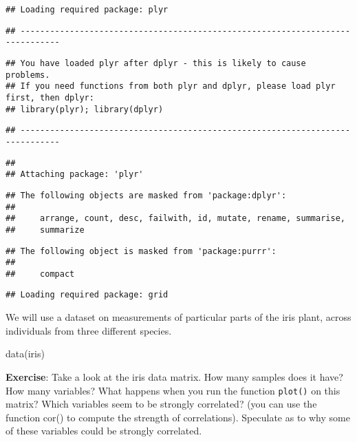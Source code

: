 \documentclass[
]{book}
\newenvironment{Shaded}{\begin{snugshade}}{\end{snugshade}}
\newcommand{\FunctionTok}[1]{\textcolor[rgb]{0.00,0.00,0.00}{#1}}
\newcommand{\NormalTok}[1]{#1}
\begin{document}
\begin{verbatim}
## Loading required package: plyr
\end{verbatim}

\begin{verbatim}
## ------------------------------------------------------------------------------
\end{verbatim}

\begin{verbatim}
## You have loaded plyr after dplyr - this is likely to cause problems.
## If you need functions from both plyr and dplyr, please load plyr first, then dplyr:
## library(plyr); library(dplyr)
\end{verbatim}

\begin{verbatim}
## ------------------------------------------------------------------------------
\end{verbatim}

\begin{verbatim}
## 
## Attaching package: 'plyr'
\end{verbatim}

\begin{verbatim}
## The following objects are masked from 'package:dplyr':
## 
##     arrange, count, desc, failwith, id, mutate, rename, summarise,
##     summarize
\end{verbatim}

\begin{verbatim}
## The following object is masked from 'package:purrr':
## 
##     compact
\end{verbatim}

\begin{verbatim}
## Loading required package: grid
\end{verbatim}

We will use a dataset on measurements of particular parts of the iris plant, across individuals from three different species.

\begin{Shaded}
\begin{Highlighting}[]
\FunctionTok{data}\NormalTok{(iris)}
\end{Highlighting}
\end{Shaded}

\textbf{Exercise}: Take a look at the iris data matrix. How many samples does it have? How many variables? What happens when you run the function \texttt{plot()} on this matrix? Which variables seem to be strongly correlated? (you can use the function cor() to compute the strength of correlations). Speculate as to why some of these variables could be strongly correlated.
\end{document}
